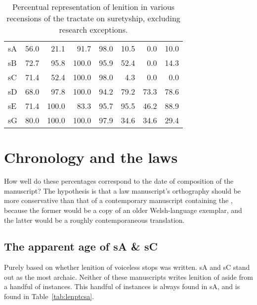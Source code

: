 \begin{table}[h]
  \centering
    \begin{tabular}{lddddddd}
    \toprule
       &  &  &  &  &  &  &  \\
      \midrule
      \gls{sA} & 56.0 & 21.1 & 91.7 & 98.0 & 10.5 & 0.0 & 10.0 \\
      \gls{sB} & 72.7 & 95.8 & 100.0 & 95.9 & 52.4 & 0.0 & 14.3 \\
      \gls{sC} & 71.4 & 52.4 & 100.0 & 98.0 & 4.3 & 0.0 & 0.0 \\
      \gls{sD} & 68.0 & 97.8 & 100.0 & 94.2 & 79.2 & 73.3 & 78.6 \\
      \gls{sE} & 71.4 & 100.0 & 83.3 & 95.7 & 95.5 & 46.2 & 88.9 \\
      \gls{sG} & 80.0 & 100.0 & 100.0 & 97.9 & 34.6 & 34.6 & 29.4 \\
    \bottomrule
    \end{tabular}%
    \caption{Percentual representation of lenition in various recensions of the tractate on suretyship, excluding research exceptions.}
    \label{tab:lenlawcountryexcre}%
  \end{table}%




\section{Chronology and the laws}
\label{sec:chronology-laws}


How well do these percentages correspond to the date of composition of the manuscript? The hypothesis is that a law manuscript's orthography should be more conservative than that of a contemporary manuscript containing the , because the former would be a copy of an older Welsh-language exemplar, and the latter would be a roughly contemporaneous translation.

\subsection{The apparent age of \gls{sA} \& \gls{sC}}
\label{sec:glsa--glsc}


Purely based on whether lenition of voiceless stops was written. \gls{sA} and \gls{sC} stand out as the most archaic. Neither of these manuscripts writes lenition of  aside from a handful of instances. This handful of instances is always found in \gls{sA}, and is found in Table~\ref{tab:lenptcsa}. 

